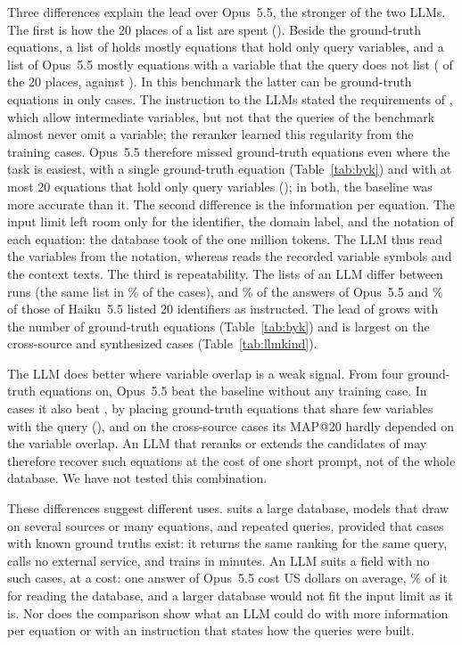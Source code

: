 Three differences explain the lead over Opus~5.5, the stronger of the two LLMs. The first is how
the 20 places of a list are spent (). Beside the ground-truth
equations, a list of \ours{} holds mostly equations that hold only query variables,
and a list of Opus~5.5 mostly equations with a variable that the query does not list
(\CompOutsideAOpus{} of the 20 places, against \CompOutsideAProp). In this benchmark the latter can
be ground-truth equations in only \NWithIntermediate{} cases. The instruction to the LLMs stated
the requirements of , which allow intermediate variables, but not that
the queries of the benchmark almost never omit a variable; the reranker learned this regularity
from the training cases. Opus~5.5 therefore missed ground-truth equations even where the task is
easiest, with a single ground-truth equation (Table~\ref{tab:byk}) and with at most 20 equations
that hold only query variables (); in both, the baseline was more
accurate than it. The second difference is the information per equation. The input limit left room
only for the identifier, the domain label, and the notation of each equation: the database took
\NDbTokens{} of the one million tokens. The LLM thus read the variables from the notation, whereas
\ours{} reads the recorded variable symbols and the context texts. The third is
repeatability. The lists of an LLM differ between runs (the same list in \SameListOpus\% of the
cases), and \ShareOpusAsInstructed\% of the answers of Opus~5.5 and \ShareHaikuAsInstructed\% of
those of Haiku~5.5 listed 20 identifiers as instructed. The lead of \ours{} grows with
the number of ground-truth equations (Table~\ref{tab:byk}) and is largest on the cross-source and
synthesized cases (Table~\ref{tab:llmkind}).

The LLM does better where variable overlap is a weak signal. From four ground-truth equations on,
Opus~5.5 beat the baseline without any training case. In
\NOpusWinRec{} cases it also beat \ours{}, by placing ground-truth equations that share
few variables with the query (), and on the cross-source cases its
MAP@20 hardly depended on the variable overlap. An LLM that reranks or extends the candidates of
\ours{} may therefore recover such equations at the cost of one short prompt, not of
the whole database. We have not tested this combination.

These differences suggest different uses. \ours{} suits a large database, models that
draw on several sources or many equations, and repeated queries, provided that cases with known
ground truths exist: it returns the same ranking for the same query, calls no external service,
and trains in minutes. An LLM suits a field with no such cases, at a cost: one answer of Opus~5.5
cost \CostPerCallOpus{} US dollars on average, \ReadShareOpus\% of it for reading the database, and
a larger database would not fit the input limit as it is. Nor does the comparison show what an LLM
could do with more information per equation or with an instruction that states how the queries
were built.

